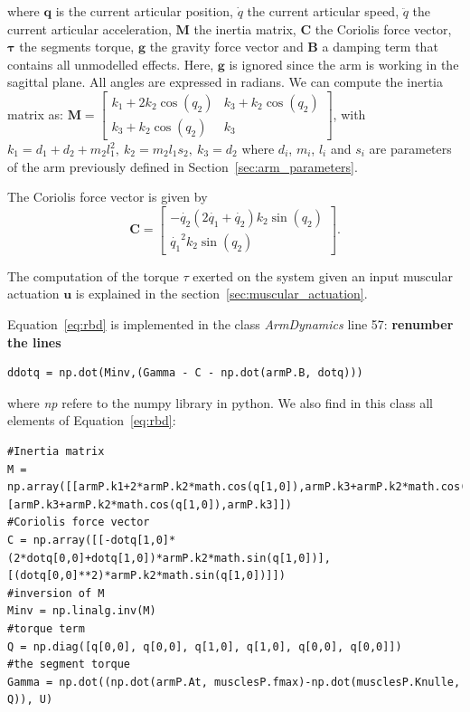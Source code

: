 \documentclass[pdftex,a4paper,11pt]{article}
\begin{document}
where $\textbf{q}$ is the current articular position, $\dot{q}$ the current articular speed, $\ddot{q}$ the current articular acceleration, $\textbf{M}$ the inertia matrix, $\textbf{C}$ the Coriolis force vector, $\boldsymbol{\tau}$ the segments torque, $\textbf{g}$ the gravity force vector and $\textbf{B}$ a damping term that contains all unmodelled effects.
Here, $\textbf{g}$ is ignored since the arm is working in the sagittal plane.
All angles are expressed in radians.
We can compute the inertia matrix as:
$
\textbf{M} = \begin{bmatrix}
           k_1 + 2 k_2 \cos(q_2)   &  k_3 + k_2 \cos(q_2) \\%
           k_3 + k_2 \cos(q_2)     &  k_3
          \end{bmatrix}
$, with $k_1 = d_1 + d_2 + m_2 l_1^2, ~ k_2 = m_2 l_1 s_2, ~ k_3 = d_2$ where $d_i$, $m_i$, $l_i$ and $s_i$ are parameters of the arm previously defined in Section~\ref{sec:arm_parameters}.

The Coriolis force vector is given by
$$
\textbf{C} = \begin{bmatrix}
           - \dot{q_2} (2 \dot{q_1} + \dot{q_2}) k_2 \sin(q_2)\\
            \dot{q_1}^2 k_2 \sin(q_2)
          \end{bmatrix}.
$$

The computation of the torque $\tau$ exerted on the system given an input muscular actuation $\textbf{u}$ is explained in the section~\ref{sec:muscular_actuation}.

Equation~\ref{eq:rbd} is implemented in the class \textit{ArmDynamics} line 57:
{\bf renumber the lines}
\begin{lstlisting}
ddotq = np.dot(Minv,(Gamma - C - np.dot(armP.B, dotq)))
\end{lstlisting}
where \textit{np} refere to the numpy library in python.
We also find in this class all elements of Equation~\ref{eq:rbd}:
\begin{lstlisting}
#Inertia matrix
M = np.array([[armP.k1+2*armP.k2*math.cos(q[1,0]),armP.k3+armP.k2*math.cos(q[1,0])],[armP.k3+armP.k2*math.cos(q[1,0]),armP.k3]])
#Coriolis force vector
C = np.array([[-dotq[1,0]*(2*dotq[0,0]+dotq[1,0])*armP.k2*math.sin(q[1,0])],[(dotq[0,0]**2)*armP.k2*math.sin(q[1,0])]])
#inversion of M
Minv = np.linalg.inv(M)
#torque term
Q = np.diag([q[0,0], q[0,0], q[1,0], q[1,0], q[0,0], q[0,0]])
#the segment torque
Gamma = np.dot((np.dot(armP.At, musclesP.fmax)-np.dot(musclesP.Knulle, Q)), U)
\end{lstlisting}
\end{document}
